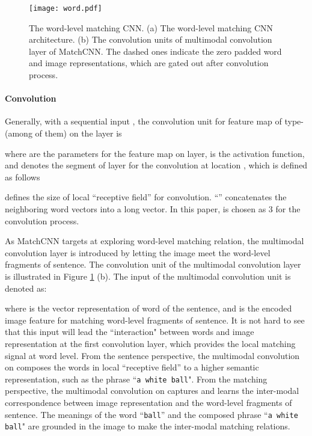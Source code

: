 \documentclass[10pt,twocolumn,letterpaper]{article}
\begin{document}
\begin{figure}[t!]
\begin{center}
   \texttt{[image: word.pdf]}

\end{center}
   \caption{The word-level matching CNN. (a) The word-level matching CNN architecture. (b) The convolution units of multimodal convolution layer of MatchCNN.   The dashed ones indicate the zero padded word and image representations, which are gated out after convolution process.}
\label{fig:word}
\end{figure}


\vspace{-10pt}
\paragraph{Convolution} Generally, with a sequential input , the convolution unit for feature map of type- (among  of them)  on the  layer is

where  are the parameters for the  feature map on  layer,  is the activation function, and  denotes the segment of  layer for the convolution at location  , which is defined as follows

 defines the size of local ``receptive field'' for convolution.  ``'' concatenates the neighboring  word vectors into a long vector. In this paper,  is chosen as 3 for the convolution process.

As MatchCNN targets at exploring word-level matching relation, the multimodal convolution layer is introduced by letting the image meet the word-level fragments of sentence. The convolution unit of the multimodal convolution layer is illustrated in Figure \ref{fig:word} (b). The input of the multimodal convolution unit is denoted as:

where  is the vector representation of word  of the sentence, and  is the encoded image feature for matching word-level fragments of sentence.  It is not hard to see that this input will lead the ``interaction" between words and image representation at the first convolution layer, which provides the local matching signal at word level. From the sentence perspective, the multimodal convolution on  composes the words  in local ``receptive field'' to a higher semantic representation, such as the phrase ``\texttt{\small a white ball}". From the matching perspective, the multimodal convolution on  captures and learns the inter-modal correspondence between image representation and the word-level fragments of sentence. The meanings of the word ``\texttt{\small ball}'' and the composed phrase ``\texttt{\small a white ball}" are grounded in the image to make the inter-modal matching relations.
\end{document}
